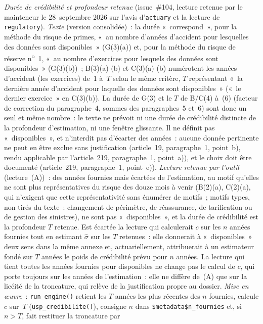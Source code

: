 \documentclass[a4paper,11pt]{article}
\newcommand{\code}[1]{\texttt{\small #1}}
\begin{document}
\noindent
\emph{Durée de crédibilité et profondeur retenue} (issue~\#104, lecture retenue par le mainteneur
le 28~septembre 2026 sur l'avis d'\code{actuary} et la lecture de \code{regulatory}).
\emph{Texte} (version consolidée)~: la durée «~correspond~», pour la méthode du risque de primes,
«~au nombre d'années d'accident pour lesquelles des données sont disponibles~» (G(3)(a)) et, pour
la méthode du risque de réserve n\textsuperscript{o}~1, «~au nombre d'exercices pour lesquels des
données sont disponibles~» (G(3)(b))~; B(3)(a)-(b) et C(3)(a)-(b) numérotent les années
d'accident (les exercices) de~1 à~$T$ selon le même critère, $T$ représentant «~la dernière année
d'accident pour laquelle des données sont disponibles~» («~le dernier exercice~» en C(3)(b)). La
durée de G(3) et le $T$ de B/C(4) à~(6) (facteur de correction du paragraphe~4, sommes des
paragraphes~5 et~6) sont donc un seul et même nombre~: le texte ne
prévoit ni une durée de crédibilité distincte de la profondeur d'estimation, ni une fenêtre
glissante. Il ne définit pas «~disponibles~», et n'interdit pas d'écarter des années~: aucune donnée
pertinente ne peut en être exclue sans justification (article~19, paragraphe~1, point~b), rendu
applicable par l'article~219, paragraphe~1, point~a)), et le choix doit être documenté
(article~219, paragraphe~1, point~e)). \emph{Lecture retenue par l'outil} (lecture~(A))~: des
années fournies mais écartées de l'estimation, au motif qu'elles ne sont plus représentatives du
risque des douze mois à venir (B(2)(a), C(2)(a), qui n'exigent que cette représentativité sans
énumérer de motifs~; motifs types, non tirés du texte~: changement de périmètre, de réassurance,
de tarification ou de gestion des sinistres), ne sont pas «~disponibles~», et la durée de
crédibilité est la profondeur $T$ retenue. Est écartée la lecture qui calculerait $c$ sur les $n$
années fournies tout en estimant $\hat\sigma$ sur les $T$ retenues~: elle donnerait à
«~disponibles~» deux sens dans la même annexe et, actuariellement, attribuerait à un estimateur
fondé sur $T$ années le poids de crédibilité prévu pour $n$ années. La lecture qui tient toutes
les années fournies pour disponibles ne change pas le calcul de $c$, qui porte toujours sur les
années de l'estimation~: elle ne diffère de~(A) que sur la licéité de la troncature, qui relève
de la justification propre au dossier. \emph{Mise en \oe uvre}~: \code{run\_engine()} retient les
$T$ années les plus récentes des $n$ fournies, calcule $c$ sur~$T$ (\code{usp\_credibilite()}),
consigne $n$ dans \code{\$metadata\$n\_fournies} et, si $n > T$, fait restituer la troncature par
\end{document}
